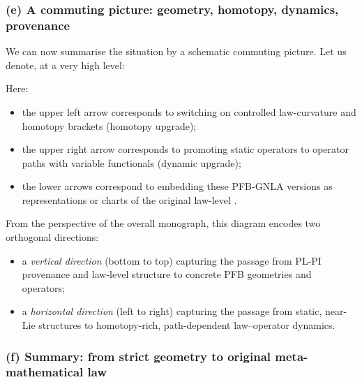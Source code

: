 \documentclass[11pt]{book}
\theoremstyle{plain}
\theoremstyle{definition}
\begin{document}
\subsubsection*{(e) A commuting picture: geometry, homotopy, dynamics, provenance}

We can now summarise the situation by a schematic commuting picture.
Let us denote, at a very high level:


Here:

\begin{itemize}
  \item the upper left arrow corresponds to switching on controlled
        law-curvature and homotopy brackets (homotopy upgrade);
  \item the upper right arrow corresponds to promoting static operators
        to operator paths with variable functionals (dynamic upgrade);
  \item the lower arrows correspond to embedding these PFB-GNLA
        versions as representations or charts of the original law-level
        \GAlgebra.
\end{itemize}

From the perspective of the overall monograph, this diagram encodes two
orthogonal directions:

\begin{itemize}
  \item a \emph{vertical direction} (bottom to top) capturing the
        passage from PL-PI provenance and law-level structure to
        concrete PFB geometries and operators;
  \item a \emph{horizontal direction} (left to right) capturing the
        passage from static, near-Lie structures to homotopy-rich,
        path-dependent law--operator dynamics.
\end{itemize}



\subsubsection*{(f) Summary: from strict geometry to original meta-mathematical law}
\end{document}
